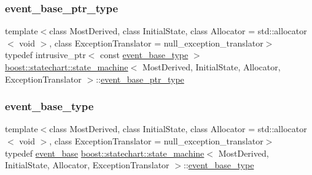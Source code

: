 \subsubsection{\texorpdfstring{event\+\_\+base\+\_\+ptr\+\_\+type}{event\_base\_ptr\_type}}
{\footnotesize\ttfamily template$<$class Most\+Derived, class Initial\+State, class Allocator = std\+::allocator$<$ void $>$, class Exception\+Translator = null\+\_\+exception\+\_\+translator$>$ \\
typedef intrusive\+\_\+ptr$<$ const \mbox{\hyperlink{classboost_1_1statechart_1_1state__machine_adb0e98d6d780a0977209fa7389b20bcd}{event\+\_\+base\+\_\+type}} $>$ \mbox{\hyperlink{classboost_1_1statechart_1_1state__machine}{boost\+::statechart\+::state\+\_\+machine}}$<$ Most\+Derived, Initial\+State, Allocator, Exception\+Translator $>$\+::\mbox{\hyperlink{classboost_1_1statechart_1_1state__machine_aa2f1c567e2d1a66786d28769312dfa08}{event\+\_\+base\+\_\+ptr\+\_\+type}}}

\mbox{\label{classboost_1_1statechart_1_1state__machine_adb0e98d6d780a0977209fa7389b20bcd}} 
\subsubsection{\texorpdfstring{event\+\_\+base\+\_\+type}{event\_base\_type}}
{\footnotesize\ttfamily template$<$class Most\+Derived, class Initial\+State, class Allocator = std\+::allocator$<$ void $>$, class Exception\+Translator = null\+\_\+exception\+\_\+translator$>$ \\
typedef \mbox{\hyperlink{classboost_1_1statechart_1_1event__base}{event\+\_\+base}} \mbox{\hyperlink{classboost_1_1statechart_1_1state__machine}{boost\+::statechart\+::state\+\_\+machine}}$<$ Most\+Derived, Initial\+State, Allocator, Exception\+Translator $>$\+::\mbox{\hyperlink{classboost_1_1statechart_1_1state__machine_adb0e98d6d780a0977209fa7389b20bcd}{event\+\_\+base\+\_\+type}}}

\mbox{\label{classboost_1_1statechart_1_1state__machine_a308a12082f9cd10b95118871f01e94da}} 
